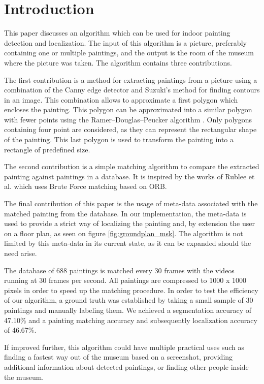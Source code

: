 \section{Introduction}	
This paper discusses an algorithm which can be used for indoor painting detection and localization. The input of this algorithm is a picture, preferably containing one or multiple paintings, and the output is the room of the museum where the picture was taken. The algorithm contains three contributions.

The first contribution is a method for extracting paintings from a picture using a combination of the Canny edge detector \cite{Canny1986} and Suzuki's method \cite{SUZUKI198532} for finding contours in an image. This combination allows to approximate a first polygon which encloses the painting. This polygon can be approximated into a similar polygon with fewer points using the Ramer–Douglas–Peucker algorithm \cite{Hershberger92speedingup}. Only polygons containing four point are considered, as they can represent the rectangular shape of the painting. This last polygon is used to transform the painting into a rectangle of predefined size.

The second contribution is a simple matching algorithm to compare the extracted painting against paintings in a database. It is inspired by the works of Rublee et al. \cite{Rublee2011} which uses Brute Force matching based on ORB. 

The final contribution of this paper is the usage of meta-data associated with the matched painting from the database. In our implementation, the meta-data is used to provide a strict way of localizing the painting and, by extension the user on a floor plan, as seen on figure \ref{fig:groundplan_msk}. The algorithm is not limited by this meta-data in its current state, as it can be expanded should the need arise.

The database of 688 paintings is matched every 30 frames with the videos running at 30 frames per second. All paintings are compressed to 1000 x 1000 pixels in order to speed up the matching procedure. In order to test the efficiency of our algorithm, a ground truth was established by taking a small sample of 30 paintings and manually labeling them. We achieved a segmentation accuracy of 47.10\% and a painting matching accuracy and subsequently localization accuracy of 46.67\%.

If improved further, this algorithm could have multiple practical uses such as finding a fastest way out of the museum based on a screenshot, providing additional information about detected paintings, or finding other people inside the museum. 

